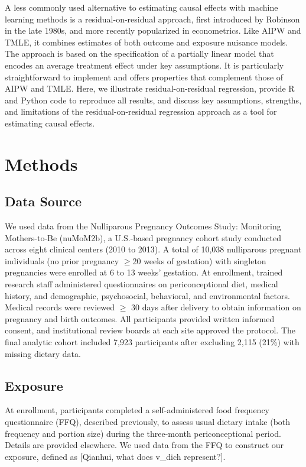 \documentclass[12pt]{article}
\begin{document}
A less commonly used alternative to estimating causal effects with machine learning methods is a residual-on-residual approach, first introduced by Robinson in the late 1980s,\cite{Robinson1988} and more recently popularized in econometrics.\cite{Chernozhukov2018} Like AIPW and TMLE, it combines estimates of both outcome and exposure nuisance models. The approach is based on the specification of a partially linear model that encodes an average treatment effect under key assumptions.\cite{Robinson1988} It is particularly straightforward to implement and offers properties that complement those of AIPW and TMLE. Here, we illustrate residual-on-residual regression, provide R and Python code to reproduce all results, and discuss key assumptions, strengths, and limitations of the residual-on-residual regression approach as a tool for estimating causal effects.

\section{Methods}

\subsection{Data Source}

We used data from the Nulliparous Pregnancy Outcomes Study: Monitoring Mothers-to-Be (nuMoM2b), a U.S.-based pregnancy cohort study conducted across eight clinical centers (2010 to 2013).\cite{Haas2016} A total of 10,038 nulliparous pregnant individuals (no prior pregnancy $\geq$20 weeks of gestation) with singleton pregnancies were enrolled at 6 to 13 weeks' gestation. At enrollment, trained research staff administered questionnaires on periconceptional diet, medical history, and demographic, psychosocial, behavioral, and environmental factors. Medical records were reviewed $\geq$ 30 days after delivery to obtain information on pregnancy and birth outcomes. All participants provided written informed consent, and institutional review boards at each site approved the protocol. The final analytic cohort included 7,923 participants after excluding 2,115 (21\%) with missing dietary data.

\subsection{Exposure}

At enrollment, participants completed a self-administered food frequency questionnaire (FFQ), described previously,\cite{Bodnar2024,Bodnar2023b} to assess usual dietary intake (both frequency and portion size) during the three-month periconceptional period. Details are provided elsewhere.\cite{Bodnar2023b} We used data from the FFQ to construct our exposure, defined as {\color{OliveGreen} [Qianhui, what does v\_dich represent?]}.
\end{document}
